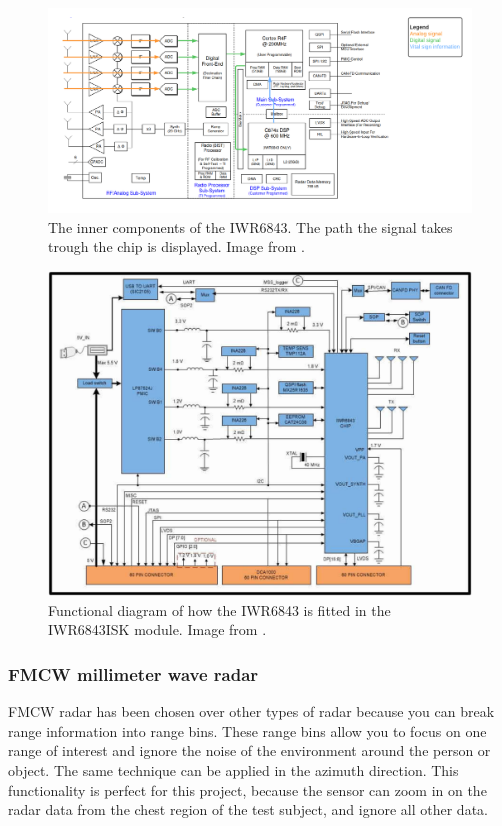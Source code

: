 
\begin{figure}[t]
\centering
\includegraphics[width=\textwidth]{figures/background/IWR inner.pdf}
\caption{The inner components of the IWR6843. The path the signal takes trough the chip is displayed. Image from \cite{iwr6843isk_website}.}
\label{fig:iwr6843_inner}
\end{figure}

\begin{figure}[t]
\centering
\includegraphics[width=.95\textwidth]{figures/background/iwr6843isk_connection.png}
\caption{Functional diagram of how the IWR6843 is fitted in the IWR6843ISK module. Image from \cite{iwr6843isk_website}.}
\label{fig:iwr6843_connection}
\end{figure}

\subsubsection{FMCW millimeter wave radar}
FMCW radar has been chosen over other types of radar because you can break range information into range bins. These range bins allow you to focus on one range of interest and ignore the noise of the environment around the person or object. The same technique can be applied in the azimuth direction. This functionality is perfect for this project, because the sensor can zoom in on the radar data from the chest region of the test subject, and ignore all other data.

